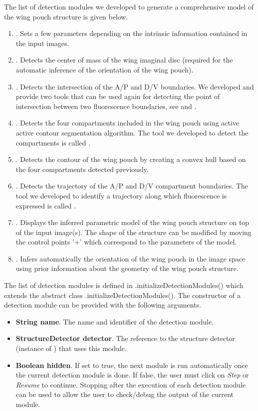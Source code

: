 The list of detection modules we developed to generate a comprehensive model of the wing pouch structure is given below.

\begin{enumerate}
 \item \PreProcessing. Sets a few parameters depending on the intrinsic information contained in the input images.
 \item \WDiscCenterDetection. Detects the center of mass of the wing imaginal disc (required for the automatic inference of the orientation of the wing pouch).
 \item \WPouchCenterDetection. Detects the intersection of the A/P and D/V boundaries. We developed and provide two tools that can be used again for detecting the point of intersection between two fluorescence boundaries, see \PlusShapeCenterDetector and \KiteSnake.
 \item \WPouchCompartmentsDetection. Detects the four compartments included in the wing pouch using active active contour segmentation algorithm. The tool we developed to detect the compartments is called \CompartmentSnake.
 \item \WPouchContourDetection. Detects the contour of the wing pouch by creating a convex hull based on the four compartments detected previously.
 \item \WPouchBoundariesDetection. Detects the trajectory of the A/P and D/V compartment boundaries. The tool we developed to identify a trajectory along which fluorescence is expressed is called \FluorescenceTrajectoryTracker.
 \item \InteractiveStructure. Displays the inferred parametric model of the wing pouch structure on top of the input image(s). The shape of the structure can be modified by moving the control points '+' which correspond to the parameters of the model.
 \item \WPouchOrientationDetection. Infers automatically the orientation of the wing pouch in the image space using prior information about the geometry of the wing pouch structure.
\end{enumerate}

The list of detection modules is defined in \WPouchStructureDetector.\-initialize\-Detection\-Modules() which extends the abstract class \StructureDetector.\-initialize\-Detection\-Modules(). The constructor of a detection module can be provided with the following arguments.

\begin{itemize}
 \item \textbf{String name}. The name and identifier of the detection module.
 \item \textbf{StructureDetector detector}. The reference to the structure detector (instance of \StructureDetector) that uses this module.
 \item \textbf{Boolean hidden}. If set to true, the next module is run automatically once the current detection module is done. If false, the user must click on \textit{Step} or \textit{Resume} to continue. Stopping after the execution of each detection module can be used to allow the user to check/debug the output of the current module.
\end{itemize}

